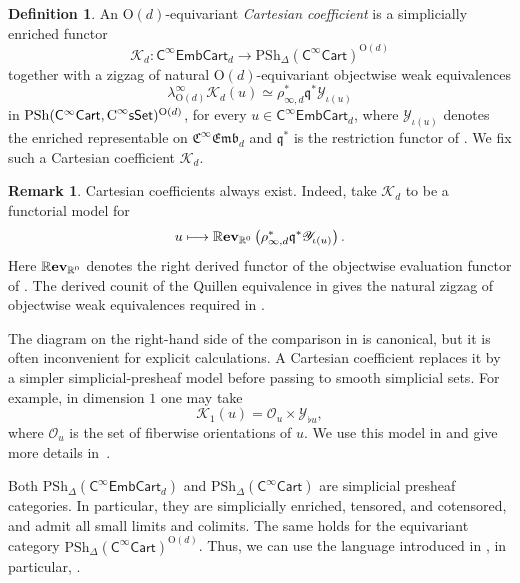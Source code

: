 \documentclass{amsart}
\newcommand{\cat}[1]{\mathsf{#1}}
\newcommand{\sset}{\cat{sSet}}
\newcommand{\CsSet}{\textnormal{C}^{\infty}\sset}
\newcommand{\Cart}{\cat{C}^{\infty}\cat{Cart}}
\newcommand{\fembcartnoniso}[1]{\cat{C}^{\infty}\cat{EmbCart}_{#1}}
\newcommand{\femb}[1]{\mathfrak{C}^{\infty}\mathfrak{Emb}_{#1}}
\renewcommand{\ev}{\textnormal{\textbf{ev}}}
\newcommand{\psh}{\mathrm{PSh}}
\newcommand{\spsh}{\mathrm{PSh}_{\Delta}}
\newcommand{\RR}{{\mathbb{R}}}
\newcommand{\Yo}{\mathscr{Y}}
\theoremstyle{definition}
\newtheorem{definition}[equation]{Definition}
\newtheorem{remark}[equation]{Remark}
\numberwithin{equation}{subsection}
\numberwithin{subsubsection}{subsection}
\begin{document}
\begin{definition}\label{def:Cartesian.coefficient}
  An \(\mathrm{O}(d)\)-equivariant \emph{Cartesian coefficient} is a
  simplicially enriched functor
  \[
    \mathcal{K}_d:
    \fembcartnoniso{d}
    \longrightarrow
    \spsh(\Cart)^{\mathrm{O}(d)}
  \]
  together with a zigzag of natural \(\mathrm{O}(d)\)-equivariant
  objectwise weak equivalences
  \[
    \lambda^\infty_{\mathrm{O}(d)}\mathcal{K}_d(u)
    \simeq
    \rho_{\infty,d}^{*}\mathfrak{q}^{*}\Yo_{\iota(u)}
  \]
  in \(\psh(\Cart,\CsSet)^{\mathrm{O}(d)}\), for every
  \(u\in\fembcartnoniso{d}\), where \(\Yo_{\iota(u)}\) denotes the enriched
  representable on \(\femb{d}\) and \(\mathfrak{q}^{*}\) is the restriction
  functor of . We fix such a
  Cartesian coefficient \(\mathcal{K}_d\).
\end{definition}

\begin{remark}\label{rem:Cartesian.coefficient.intuition}
  Cartesian coefficients always exist. Indeed, take \(\mathcal{K}_d\) to
  be a functorial model for
  \[
    u\longmapsto
    \RR\ev_{\RR^0}\left(
      \rho_{\infty,d}^{*}\mathfrak{q}^{*}\Yo_{\iota(u)}
    \right).
  \]
  Here \(\RR\ev_{\RR^0}\) denotes the right derived functor of the
  objectwise evaluation functor of
  . The derived counit of the Quillen
  equivalence in  gives the natural
  zigzag of objectwise weak equivalences required in
  .

  The diagram on the right-hand side of the comparison in
   is canonical, but it is often inconvenient
  for explicit calculations. A Cartesian coefficient replaces it by a
  simpler simplicial-presheaf model before passing to smooth simplicial sets.
  For example, in dimension \(1\) one may take
  \[
    \mathcal{K}_1(u)=\mathcal{O}_u\times\Yo_{\flat u},
  \]
  where \(\mathcal{O}_u\) is the set of fiberwise orientations of \(u\). We use
  this model in  and give
  more details in~\cite{KP26}.
\end{remark}

Both \(\spsh(\fembcartnoniso{d})\) and \(\spsh(\Cart)\) are simplicial
presheaf categories. In particular, they are simplicially enriched, tensored,
and cotensored, and admit all small limits and colimits. The same holds for
the equivariant category \({\spsh(\Cart)}^{\mathrm{O}(d)}\). Thus, we can use
the language introduced in , in particular,
.
\end{document}
